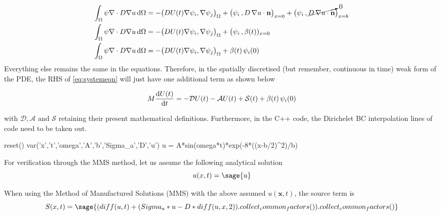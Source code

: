 \documentclass[a4paper]{article}
\newenvironment{MyColorPar}{%
        \leavevmode\color{imperialbrick}\ignorespaces%
    }{%
}%
\begin{document}
\begin{MyColorPar}
    \begin{align}
        \int_\Omega \psi \nabla \cdot D \nabla u\, \mathrm{d}\Omega &= - \big(D U(t) \nabla \psi_i, \nabla \psi_j \big)_\Omega  +  \big(\psi_i \,, D \, \nabla u\cdot \mathbf{n}\big)_{x=0} + \big(\psi_i \,, \cancelto{0}{D \, \nabla u\cdot \mathbf{n}}\big)_{x=b} \\
        \int_\Omega \psi \nabla \cdot D \nabla u\, \mathrm{d}\Omega &= - \big(D U(t) \nabla \psi_i, \nabla \psi_j \big)_\Omega  +  \big(\psi_i \,,\beta(t))_{x=0} \\
            \int_\Omega \psi \nabla \cdot D \nabla u\, \mathrm{d}\Omega &= - \big(D U(t) \nabla \psi_i, \nabla \psi_j \big)_\Omega  +  \beta(t)\, \psi_i(0)
    \end{align}
Everything else remains the same in the equations. Therefore, in the spatially discretised (but remember, continuous in time) weak form of the PDE, the RHS of \cref{eq:systemeqn} will just have one additional term as shown below

\begin{equation}\label{eq:systemeqnwithneumannbc}
        M \diff{U(t)}{t} = -\mathcal{D} U(t) - \mathcal{A} U(t) + \mathcal{S}(t) + \beta(t)\, \psi_i(0)
\end{equation}

with $\mathcal{D}, \mathcal{A} \text{ and } \mathcal{S}$ retaining their present mathematical definitions. Furthermore, in the C++ code, the Dirichelet BC interpolation lines of code need to be taken out.

\begin{sagesilent}
    reset()
    var('x','t','omega','A','b','Sigma_a','D','u')
    u = A*sin(omega*t)*exp(-8*((x-b/2)^2)/b)
\end{sagesilent}
For verification through the MMS method, let us assume the following analytical solution
\begin{equation}
    u(x,t) = \sage{u}
\end{equation}

When using the Method of Manufactured Solutions (MMS) with the above assumed $u(\mathbf{x},t)$, the source term is
\begin{equation}
    S(x,t) = \sage{(diff(u,t) + (Sigma_a*u - D*diff(u,x,2)).collect_common_factors()).collect_common_factors()}
\end{equation}

\end{MyColorPar}
\end{document}
